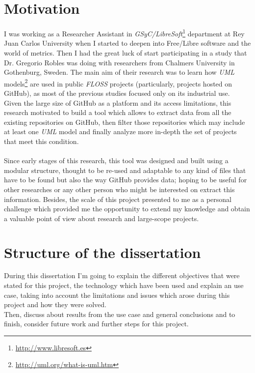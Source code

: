 \documentclass[a4paper, 12pt]{book}
\begin{document}
\section{Motivation}
\label{sec:motivation}
I was working as a Researcher Assistant in \emph{GSyC/LibreSoft}\footnote{\url{http://www.libresoft.es}} department at Rey Juan Carlos University when I started to
deepen into Free/Libre software and the world of metrics. Then I had the great luck of start participating in a study that
Dr. Gregorio Robles was doing with researchers from Chalmers University in Gothenburg, Sweden. The main aim of their research was to
learn how \emph{UML} models\footnote{\url{http://uml.org/what-is-uml.htm}} are used in public \emph{FLOSS} projects (particularly, projects hosted on GitHub),
as most of the previous studies focused only on its industrial use.\\
Given the large size of GitHub as a platform and its access limitations, this research motivated to build a tool which allows to
extract data from all the existing repositories on GitHub, then filter those repositories which may include at least one
\emph{UML} model and finally analyze more in-depth the set of projects that meet this condition.\\\\
Since early stages of this research, this tool was designed and built using a modular structure, thought to be re-used
and adaptable to any kind of files that have to be found but also the way GitHub provides data; hoping to be useful
for other researches or any other person who might be interested on extract this information. Besides, the scale of this project
presented to me as a personal challenge which provided me the opportunity to extend my knowledge and obtain a valuable point of
view about research and large-scope projects.

\section{Structure of the dissertation}
\label{sec:estructura}
During this dissertation I'm going to explain the different objectives that were stated for this project, the technology
which have been used and explain an use case, taking into account the limitations and issues which arose
during this project and how they were solved.\\Then, discuss about results from the use case and general conclusions
and to finish, consider future work and further steps for this project.
\cleardoublepage
\end{document}
